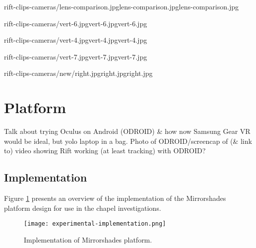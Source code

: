        {rift-clips-cameras/lens-comparison.jpg}{lens-comparison.jpg}{lens-comparison.jpg}

       {rift-clips-cameras/vert-6.jpg}{vert-6.jpg}{vert-6.jpg}

       {rift-clips-cameras/vert-4.jpg}{vert-4.jpg}{vert-4.jpg}

       {rift-clips-cameras/vert-7.jpg}{vert-7.jpg}{vert-7.jpg}

       {rift-clips-cameras/new/right.jpg}{right.jpg}{right.jpg}


\section{Platform}

Talk about trying Oculus on Android (ODROID) \& how now Samsung Gear VR would be ideal, but yolo laptop in a bag. Photo of ODROID/screencap of (\& link to) video showing Rift working (at least tracking) with ODROID?


\subsection{Implementation}
Figure \ref{experimentalimplementation} presents an overview of the implementation of the Mirrorshades platform design for use in the chapel investigations.

\begin{figure}[h]
	\thispagestyle{empty}
	\begin{center}
		\texttt{[image: experimental-implementation.png]}
		\caption{Implementation of Mirrorshades platform.}
		\label{experimentalimplementation}
	\end{center}
\end{figure}


